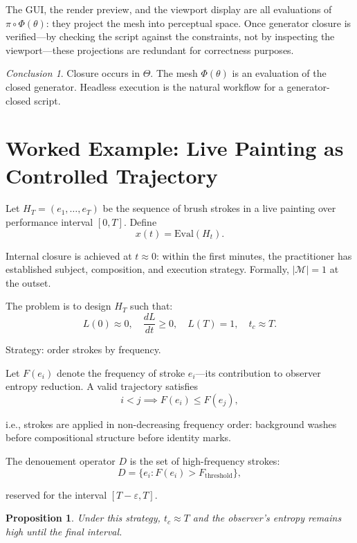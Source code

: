 \documentclass[11pt, twoside]{article}
\theoremstyle{plain}
\newtheorem{proposition}[theorem]{Proposition}
\theoremstyle{definition}
\theoremstyle{remark}
\newtheorem{conclusion}[theorem]{Conclusion}
\begin{document}
The GUI, the render preview, and the viewport display are all evaluations of $\pi \circ \Phi(\theta)$: they project the mesh into perceptual space. Once generator closure is verified---by checking the script against the constraints, not by inspecting the viewport---these projections are redundant for correctness purposes.

\begin{conclusion}
Closure occurs in $\Theta$. The mesh $\Phi(\theta)$ is an evaluation of the closed generator. Headless execution is the natural workflow for a generator-closed script.
\end{conclusion}

\section{Worked Example: Live Painting as Controlled Trajectory}
\label{app:live}

Let $H_T = (e_1, \dots, e_T)$ be the sequence of brush strokes in a live painting over performance interval $[0, T]$. Define
\[
x(t) = \text{Eval}(H_t).
\]

Internal closure is achieved at $t \approx 0$: within the first minutes, the practitioner has established subject, composition, and execution strategy. Formally, $|\mathcal{M}| = 1$ at the outset.

The problem is to design $H_T$ such that:
\[
L(0) \approx 0, \quad \frac{dL}{dt} \geq 0, \quad L(T) = 1, \quad t_c \approx T.
\]

Strategy: order strokes by frequency.

Let $F(e_i)$ denote the frequency of stroke $e_i$---its contribution to observer entropy reduction. A valid trajectory satisfies
\[
i < j \implies F(e_i) \leq F(e_j),
\]

i.e., strokes are applied in non-decreasing frequency order: background washes before compositional structure before identity marks.

The denouement operator $D$ is the set of high-frequency strokes:
\[
D = \{ e_i : F(e_i) > F_{\text{threshold}} \},
\]

reserved for the interval $[T - \varepsilon, T]$.

\begin{proposition}
Under this strategy, $t_c \approx T$ and the observer's entropy remains high until the final interval.
\end{proposition}
\end{document}
